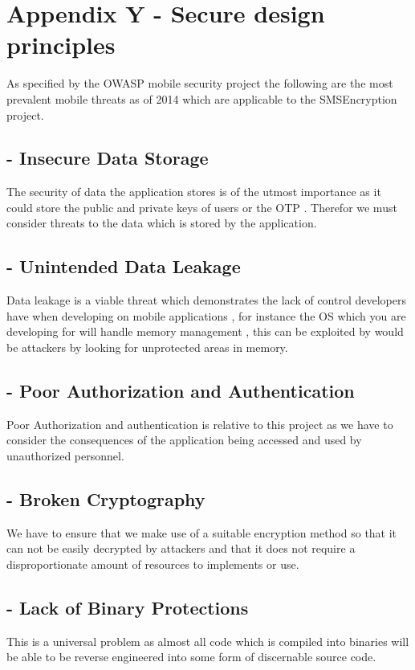 \section{Appendix Y - Secure design principles}

As specified by the OWASP mobile security project the following are the  most prevalent mobile threats as of 2014 which are applicable to the SMSEncryption project.

\subsection*{ - Insecure Data Storage}
The security of data the application stores is of the utmost importance as it could store the public and private keys of users or the OTP . Therefor we must consider threats to the data which is stored by the application. 
\subsection*{ - Unintended Data Leakage}
Data leakage is a viable threat which demonstrates the lack of control developers have when developing on mobile applications , for instance the OS which you are developing for will handle memory management , this can be exploited by would be attackers by looking for unprotected areas in memory.
\subsection*{ - Poor Authorization and Authentication}
Poor Authorization and authentication is relative to this project as we have to consider the consequences of the application being accessed and used by unauthorized personnel.
\subsection*{ - Broken Cryptography}
We have to ensure that we make use of a suitable encryption method so that it can not be easily decrypted by attackers and that it does  not require a disproportionate amount of resources to implements or use.
\subsection*{ - Lack of Binary Protections}
This is a universal problem as almost all code which is compiled into binaries will be able to be reverse engineered into some form of discernable source code.
